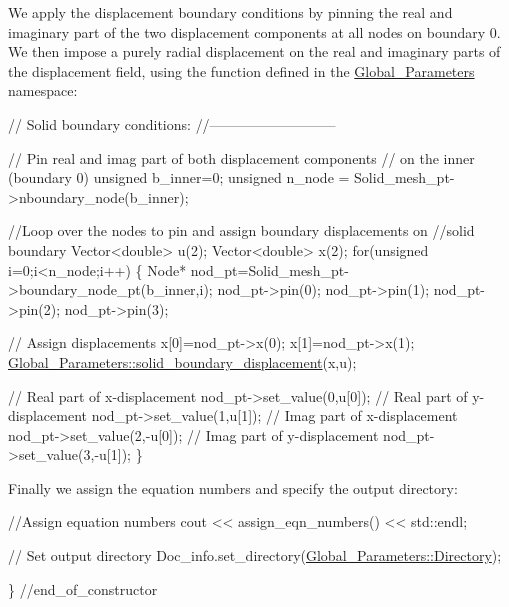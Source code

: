 We apply the displacement boundary conditions by pinning the real and imaginary part of the two displacement components at all nodes on boundary 0. We then impose a purely radial displacement on the real and imaginary parts of the displacement field, using the function defined in the {\ttfamily \hyperlink{namespaceGlobal__Parameters}{Global\+\_\+\+Parameters}} namespace\+:


\begin{DoxyCodeInclude}
 \textcolor{comment}{// Solid boundary conditions:}
 \textcolor{comment}{//---------------------------}

 \textcolor{comment}{// Pin real and imag part of both displacement components }
 \textcolor{comment}{// on the inner (boundary 0)}
 \textcolor{keywordtype}{unsigned} b\_inner=0;
 \textcolor{keywordtype}{unsigned} n\_node = Solid\_mesh\_pt->nboundary\_node(b\_inner);
 
 \textcolor{comment}{//Loop over the nodes to pin and assign boundary displacements on }
 \textcolor{comment}{//solid boundary}
 Vector<double> u(2);
 Vector<double> x(2);
 \textcolor{keywordflow}{for}(\textcolor{keywordtype}{unsigned} i=0;i<n\_node;i++)
  \{
   Node* nod\_pt=Solid\_mesh\_pt->boundary\_node\_pt(b\_inner,i);
   nod\_pt->pin(0);
   nod\_pt->pin(1);
   nod\_pt->pin(2);
   nod\_pt->pin(3);
   
   \textcolor{comment}{// Assign displacements}
   x[0]=nod\_pt->x(0);   
   x[1]=nod\_pt->x(1);   
   \hyperlink{namespaceGlobal__Parameters_a95af753fa152ac6013bc4f640816f7ce}{Global\_Parameters::solid\_boundary\_displacement}(x,u);

   \textcolor{comment}{// Real part of x-displacement}
   nod\_pt->set\_value(0,u[0]);
   \textcolor{comment}{// Real part of y-displacement}
   nod\_pt->set\_value(1,u[1]);
   \textcolor{comment}{// Imag part of x-displacement}
   nod\_pt->set\_value(2,-u[0]);
   \textcolor{comment}{// Imag part of y-displacement}
   nod\_pt->set\_value(3,-u[1]);
  \}

\end{DoxyCodeInclude}


Finally we assign the equation numbers and specify the output directory\+:


\begin{DoxyCodeInclude}

 \textcolor{comment}{//Assign equation numbers}
 cout << assign\_eqn\_numbers() << std::endl; 

 \textcolor{comment}{// Set output directory}
 Doc\_info.set\_directory(\hyperlink{namespaceGlobal__Parameters_a301ab922df72030c660b21328d6caf76}{Global\_Parameters::Directory});

\} \textcolor{comment}{//end\_of\_constructor}

\end{DoxyCodeInclude}




